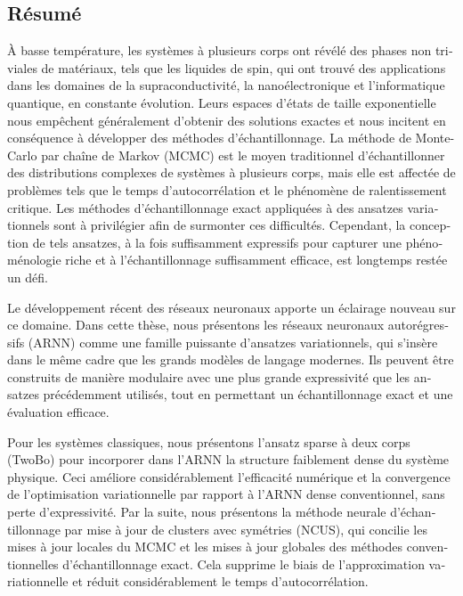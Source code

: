 \begin{otherlanguage}{french}
\cleardoublepage
\chapter*{Résumé}

À basse température, les systèmes à plusieurs corps ont révélé des phases non triviales de matériaux, tels que les liquides de spin, qui ont trouvé des applications dans les domaines de la supraconductivité, la nanoélectronique et l'informatique quantique, en constante évolution.
Leurs espaces d'états de taille exponentielle nous empêchent généralement d'obtenir des solutions exactes et nous incitent en conséquence à développer des méthodes d'échantillonnage.
La méthode de Monte-Carlo par chaîne de Markov (MCMC) est le moyen traditionnel d'échantillonner des distributions complexes de systèmes à plusieurs corps, mais elle est affectée de problèmes tels que le temps d'autocorrélation et le phénomène de ralentissement critique.
Les méthodes d'échantillonnage exact appliquées à des ansatzes variationnels sont à privilégier afin de surmonter ces difficultés. Cependant, la conception de tels ansatzes, à la fois suffisamment expressifs pour capturer une phénoménologie riche et à l'échantillonnage suffisamment efficace, est longtemps restée un défi.

Le développement récent des réseaux neuronaux apporte un éclairage nouveau sur ce domaine.
Dans cette thèse, nous présentons les réseaux neuronaux autorégressifs (ARNN) comme une famille puissante d'ansatzes variationnels, qui s'insère dans le même cadre que les grands modèles de langage modernes.
Ils peuvent être construits de manière modulaire avec une plus grande expressivité que les ansatzes précédemment utilisés, tout en permettant un échantillonnage exact et une évaluation efficace.

Pour les systèmes classiques, nous présentons l'ansatz sparse à deux corps (TwoBo) pour incorporer dans l'ARNN la structure faiblement dense du système physique.
Ceci améliore considérablement l'efficacité numérique et la convergence de l'optimisation variationnelle par rapport à l'ARNN dense conventionnel, sans perte d'expressivité.
Par la suite, nous présentons la méthode neurale d'échantillonnage par mise à jour de clusters avec symétries (NCUS), qui concilie les mises à jour locales du MCMC et les mises à jour globales des méthodes conventionnelles d'échantillonnage exact.
Cela supprime le biais de l'approximation variationnelle et réduit considérablement le temps d'autocorrélation.


\end{otherlanguage}
